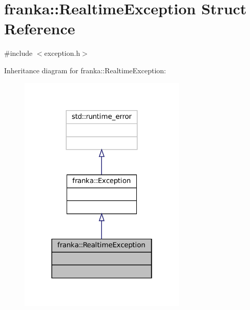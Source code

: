 \hypertarget{structfranka_1_1RealtimeException}{}\section{franka\+:\+:Realtime\+Exception Struct Reference}
\label{structfranka_1_1RealtimeException}


{\ttfamily \#include $<$exception.\+h$>$}



Inheritance diagram for franka\+:\+:Realtime\+Exception\+:
\nopagebreak
\begin{figure}[H]
\begin{center}
\leavevmode
\includegraphics[width=226pt]{structfranka_1_1RealtimeException__inherit__graph}
\end{center}
\end{figure}



